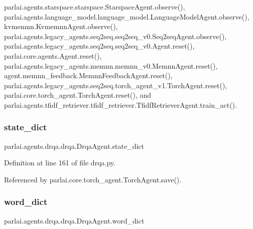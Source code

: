 parlai.\+agents.\+starspace.\+starspace.\+Starspace\+Agent.\+observe(), parlai.\+agents.\+language\+\_\+model.\+language\+\_\+model.\+Language\+Model\+Agent.\+observe(), kvmemnn.\+Kvmemnn\+Agent.\+observe(), parlai.\+agents.\+legacy\+\_\+agents.\+seq2seq.\+seq2seq\+\_\+v0.\+Seq2seq\+Agent.\+observe(), parlai.\+agents.\+legacy\+\_\+agents.\+seq2seq.\+seq2seq\+\_\+v0.\+Agent.\+reset(), parlai.\+core.\+agents.\+Agent.\+reset(), parlai.\+agents.\+legacy\+\_\+agents.\+memnn.\+memnn\+\_\+v0.\+Memnn\+Agent.\+reset(), agent.\+memnn\+\_\+feedback.\+Memnn\+Feedback\+Agent.\+reset(), parlai.\+agents.\+legacy\+\_\+agents.\+seq2seq.\+torch\+\_\+agent\+\_\+v1.\+Torch\+Agent.\+reset(), parlai.\+core.\+torch\+\_\+agent.\+Torch\+Agent.\+reset(), and parlai.\+agents.\+tfidf\+\_\+retriever.\+tfidf\+\_\+retriever.\+Tfidf\+Retriever\+Agent.\+train\+\_\+act().

\mbox{\label{classparlai_1_1agents_1_1drqa_1_1drqa_1_1DrqaAgent_a425092eeec6b948bcd9ed4765f6a4afc}} 
\subsubsection{\texorpdfstring{state\+\_\+dict}{state\_dict}}
{\footnotesize\ttfamily parlai.\+agents.\+drqa.\+drqa.\+Drqa\+Agent.\+state\+\_\+dict}



Definition at line 161 of file drqa.\+py.



Referenced by parlai.\+core.\+torch\+\_\+agent.\+Torch\+Agent.\+save().

\mbox{\label{classparlai_1_1agents_1_1drqa_1_1drqa_1_1DrqaAgent_aa49b71f40d0e4fb91062cab736f49146}} 
\subsubsection{\texorpdfstring{word\+\_\+dict}{word\_dict}}
{\footnotesize\ttfamily parlai.\+agents.\+drqa.\+drqa.\+Drqa\+Agent.\+word\+\_\+dict}



